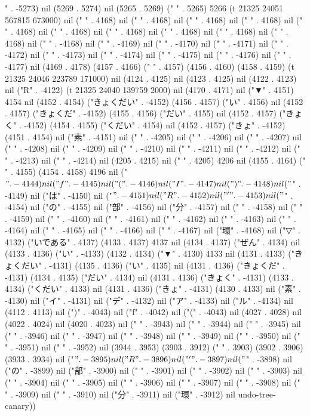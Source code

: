 " . -5273) nil (5269 . 5274) nil (5265 . 5269) (" " . 5265) 5266 (t 21325 24051 567815 673000) nil (" " . 4168) nil (" " . 4168) nil (" " . 4168) nil (" " . 4168) nil (" " . 4168) nil (" " . 4168) nil (" " . 4168) nil (" " . 4168) nil (" " . 4168) nil ("
" . 4168) nil ("
" . -4168) nil (" " . -4169) nil (" " . -4170) nil (" " . -4171) nil (" " . -4172) nil (" " . -4173) nil (" " . -4174) nil (" " . -4175) nil (" " . -4176) nil (" " . -4177) nil (4169 . 4178) (4157 . 4166) ("   " . 4157) (4156 . 4160) (4158 . 4159) (t 21325 24046 223789 171000) nil (4124 . 4125) nil (4123 . 4125) nil (4122 . 4123) nil ("R" . -4122) (t 21325 24040 139759 2000) nil (4170 . 4171) nil ("▼" . 4151) 4154 nil (4152 . 4154) ("きょくだい" . -4152) (4156 . 4157) ("い" . 4156) nil (4152 . 4157) ("きょくだ" . -4152) (4155 . 4156) ("だい" . 4155) nil (4152 . 4157) ("きょく" . -4152) (4154 . 4155) ("くだい" . 4154) nil (4152 . 4157) ("きょ" . -4152) (4151 . 4154) nil ("素" . -4151) nil ("
" . -4205) nil (" " . -4206) nil (" " . -4207) nil (" " . -4208) nil (" " . -4209) nil (" " . -4210) nil (" " . -4211) nil (" " . -4212) nil (" " . -4213) nil (" " . -4214) nil (4205 . 4215) nil (" " . 4205) 4206 nil (4155 . 4164) ("   " . 4155) (4154 . 4158) 4196 nil ("$" . -4144) nil ("f" . -4145) nil ("(" . -4146) nil ("I" . -4147) nil (")" . -4148) nil ("$" . -4149) nil ("は" . -4150) nil ("$" . -4151) nil ("R" . -4152) nil ("'" . -4153) nil ("$" . -4154) nil ("の" . -4155) nil ("部" . -4156) nil ("分" . -4157) nil ("
" . -4158) nil (" " . -4159) nil (" " . -4160) nil (" " . -4161) nil (" " . -4162) nil (" " . -4163) nil (" " . -4164) nil (" " . -4165) nil (" " . -4166) nil (" " . -4167) nil ("環" . -4168) nil ("▽" . 4132) ("いである" . 4137) (4133 . 4137) 4137 nil (4134 . 4137) ("ぜん" . 4134) nil (4133 . 4136) ("い" . -4133) (4132 . 4134) ("▼" . 4130) 4133 nil (4131 . 4133) ("きょくだい" . -4131) (4135 . 4136) ("い" . 4135) nil (4131 . 4136) ("きょくだ" . -4131) (4134 . 4135) ("だい" . 4134) nil (4131 . 4136) ("きょく" . -4131) (4133 . 4134) ("くだい" . 4133) nil (4131 . 4136) ("きょ" . -4131) (4130 . 4133) nil ("素" . -4130) nil ("イ" . -4131) nil ("デ" . -4132) nil ("ア" . -4133) nil ("ル" . -4134) nil (4112 . 4113) nil (")" . -4043) nil ("f" . -4042) nil ("(" . -4043) nil (4027 . 4028) nil (4022 . 4024) nil (4020 . 4023) nil ("
" . -3943) nil (" " . -3944) nil (" " . -3945) nil (" " . -3946) nil (" " . -3947) nil (" " . -3948) nil (" " . -3949) nil (" " . -3950) nil (" " . -3951) nil (" " . -3952) nil (3944 . 3953) (3903 . 3912) ("   " . 3903) (3902 . 3906) (3933 . 3934) nil ("$" . -3895) nil ("R" . -3896) nil ("'" . -3897) nil ("$" . -3898) nil ("の" . -3899) nil ("部" . -3900) nil ("
" . -3901) nil (" " . -3902) nil (" " . -3903) nil (" " . -3904) nil (" " . -3905) nil (" " . -3906) nil (" " . -3907) nil (" " . -3908) nil (" " . -3909) nil (" " . -3910) nil ("分" . -3911) nil ("環" . -3912) nil undo-tree-canary))
